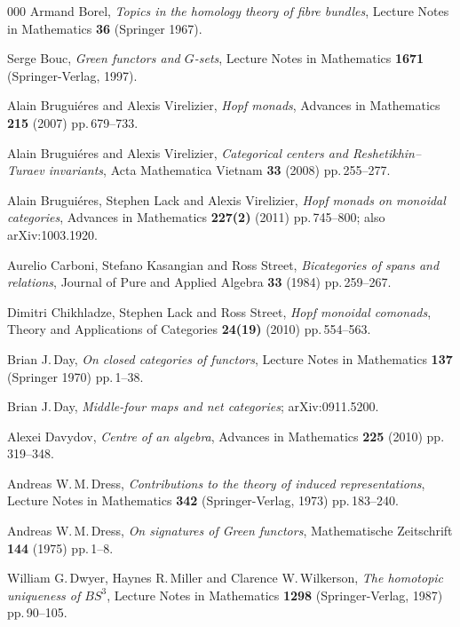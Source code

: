 \documentclass[a4paper,12pt]{article}
\theoremstyle{definition}
\theoremstyle{fact}
\theoremstyle{genquest}
\theoremstyle{step}
\begin{document}
\begin{thebibliography}{000}
 Armand Borel, \textit{Topics in the homology theory of fibre bundles}, Lecture Notes in Mathematics \textbf{36} (Springer 1967).

 Serge Bouc, \textit{Green functors and $G$-sets}, Lecture Notes in Mathematics \textbf{1671} (Springer-Verlag, 1997). 

 Alain Brugui\'eres and Alexis Virelizier, \textit{Hopf monads}, Advances in Mathematics \textbf{215} (2007) pp.\,679--733.

 Alain Brugui\'eres and Alexis Virelizier, \textit{Categorical centers and Reshetikhin--Turaev invariants}, Acta Mathematica Vietnam \textbf{33} (2008) pp.\,255--277.

 Alain Brugui\'eres, Stephen Lack and Alexis Virelizier, \textit{Hopf monads on monoidal categories}, Advances in Mathematics \textbf{227(2)} (2011) pp.\,745--800; also arXiv:1003.1920.

 Aurelio Carboni, Stefano Kasangian and Ross Street, \textit{Bicategories of spans and relations}, Journal of Pure and Applied Algebra \textbf{33} (1984) pp.\,259--267.

 Dimitri Chikhladze, Stephen Lack and Ross Street, \textit{Hopf monoidal comonads}, Theory and Applications of Categories \textbf{24(19)} (2010) pp.\,554--563.

 Brian J.\,Day, \textit{On closed categories of functors}, Lecture Notes in Mathematics \textbf{137} (Springer 1970) pp.\,1--38.

 Brian J.\,Day, \textit{Middle-four maps and net categories}; arXiv:0911.5200. 

 Alexei Davydov, \textit{Centre of an algebra}, Advances in Mathematics \textbf{225} (2010) pp.\,319--348.

 Andreas W.\,M.\,Dress, \textit{Contributions to the theory of induced representations}, Lecture Notes in Mathematics \textbf{342} (Springer-Verlag, 1973) pp.\,183--240.

 Andreas W.\,M.\,Dress, \textit{On signatures of Green functors}, Mathematische Zeit\-schrift \textbf{144} (1975) pp.\,1--8.

 William G.\,Dwyer, Haynes R.\,Miller and Clarence W.\,Wilkerson, \textit{The homotopic uniqueness of $BS^3$}, Lecture Notes in Mathematics \textbf{1298} (Springer-Verlag, 1987) pp.\,90--105.


\end{thebibliography}
\end{document}
